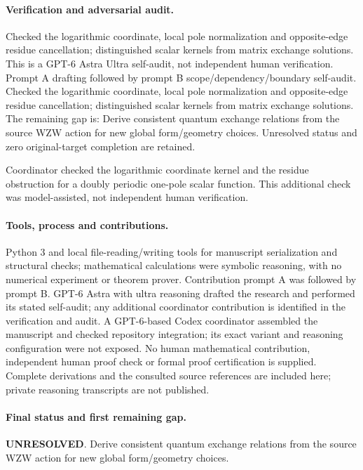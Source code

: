 \documentclass[11pt]{article}
\begin{document}
\paragraph{Verification and adversarial audit.}
Checked the logarithmic coordinate, local pole normalization and opposite-edge residue cancellation; distinguished scalar kernels from matrix exchange solutions. This is a GPT-6 Astra Ultra self-audit, not independent human verification. Prompt A drafting followed by prompt B scope/dependency/boundary self-audit. Checked the logarithmic coordinate, local pole normalization and opposite-edge residue cancellation; distinguished scalar kernels from matrix exchange solutions. The remaining gap is: Derive consistent quantum exchange relations from the source WZW action for new global form/geometry choices. Unresolved status and zero original-target completion are retained.

Coordinator checked the logarithmic coordinate kernel and the residue obstruction for a doubly periodic one-pole scalar function. This additional check was model-assisted, not independent human verification.

\paragraph{Tools, process and contributions.}
Python 3 and local file-reading/writing tools for manuscript serialization and structural checks; mathematical calculations were symbolic reasoning, with no numerical experiment or theorem prover. Contribution prompt A was followed by prompt B. GPT-6 Astra with ultra reasoning drafted the research and performed its stated self-audit; any additional coordinator contribution is identified in the verification and audit. A GPT-6-based Codex coordinator assembled the manuscript and checked repository integration; its exact variant and reasoning configuration were not exposed. No human mathematical contribution, independent human proof check or formal proof certification is supplied. Complete derivations and the consulted source references are included here; private reasoning transcripts are not published.

\paragraph{Final status and first remaining gap.}
\textbf{UNRESOLVED}. Derive consistent quantum exchange relations from the source WZW action for new global form/geometry choices.
\end{document}
